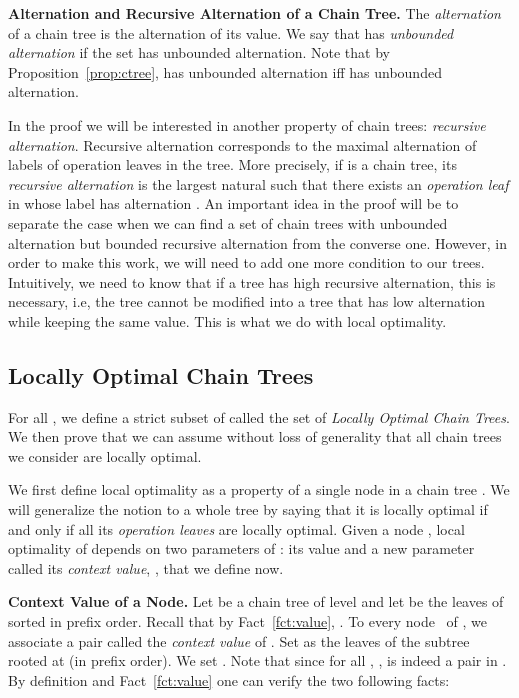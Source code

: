 \documentclass[envcountsame]{llncs}
\newcommand\chain{chain\xspace}
\newcommand\Chain{Chain\xspace}
\begin{document}
\medskip
\noindent
{\bf Alternation and Recursive Alternation of a \Chain Tree.} The
\emph{alternation} of a \chain tree is the alternation of its
value. We say that  has \emph{unbounded alternation} if  
the set  has unbounded alternation. Note that by
Proposition~\ref{prop:ctree},  has unbounded
alternation iff  has unbounded alternation.

In the proof we will be interested in another property of \chain 
trees: \emph{recursive alternation}. Recursive alternation corresponds
to the maximal alternation of labels of operation leaves in the tree.
More precisely, if  is a \chain tree, its \emph{recursive
  alternation} is the largest natural  such that there exists an
\emph{operation leaf} in  whose label has alternation . An
important idea in the proof will be to separate the case when we can
find a set of \chain trees with unbounded alternation but bounded
recursive alternation from the converse one. However, in order to make
this work, we will need to add one more condition to our
trees. Intuitively, we need to know that if a tree has high recursive
alternation, this is necessary, i.e, the tree cannot be modified into 
a tree that has low alternation while keeping the same value. This is
what we do with local optimality.

\subsection{Locally Optimal \Chain Trees}

For all , we define a strict subset of  called 
the set of \emph{Locally Optimal \Chain Trees}. We then prove that
we can assume without loss of generality that all \chain trees we
consider are locally optimal.

We first define local optimality as a property of a single node  
in a \chain tree . We will generalize the notion to a whole tree
by saying that it is locally optimal if and only if all its
\emph{operation leaves} are locally optimal. Given a node , local
optimality of  depends on two parameters of : its value
 and a new parameter called its \emph{context value},
, that we define now. 

\medskip
\noindent
{\bf Context Value of a Node.} Let  be a \chain tree of level 
and let  be the leaves of  sorted in prefix
order. Recall that by Fact~\ref{fct:value}, . To every node~ of , we associate a
pair  called the \emph{context 
  value} of . Set  as the leaves of the subtree
rooted at  (in prefix order). We set . Note that since
for all , ,  is indeed a
pair in . By definition and Fact~\ref{fct:value}
one can verify the two following facts:
\end{document}
